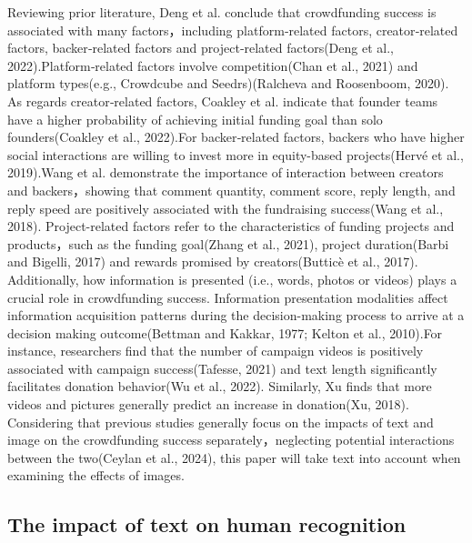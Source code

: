 \documentclass[a4paper]{article}
\begin{document}
Reviewing prior literature, Deng et al. conclude that crowdfunding success is associated with many factors，including platform‑related factors, creator‑related factors, backer‑related factors and project‑related factors(Deng et al., 2022).Platform‑related factors involve competition(Chan et al., 2021) and platform types(e.g., Crowdcube and Seedrs)(Ralcheva and Roosenboom, 2020). As regards creator‑related factors, Coakley et al. indicate that founder teams have a higher probability of achieving initial funding goal than solo founders(Coakley et al., 2022).For backer‑related factors, backers who have higher social interactions are willing to invest more in equity-based projects(Hervé et al., 2019).Wang et al. demonstrate the importance of interaction between creators and backers，showing that comment quantity, comment score, reply length, and reply speed are positively associated with the fundraising success(Wang et al., 2018). Project-related factors refer to the characteristics of funding projects and products，such as the funding goal(Zhang et al., 2021), project duration(Barbi and Bigelli, 2017) and rewards promised by creators(Butticè et al., 2017). Additionally, how information is presented (i.e., words, photos or videos) plays a crucial role in crowdfunding success. Information presentation modalities affect information acquisition patterns during the decision-making process to arrive at a decision making outcome(Bettman and Kakkar, 1977; Kelton et al., 2010).For instance, researchers find that the number of campaign videos is positively associated with campaign success(Tafesse, 2021) and text length significantly facilitates donation behavior(Wu et al., 2022). Similarly, Xu finds that more videos and pictures generally predict an increase in donation(Xu, 2018). Considering that previous studies generally focus on the impacts of text and image on the crowdfunding success separately，neglecting potential interactions between the two(Ceylan et al., 2024), this paper will take text into account when examining the effects of images.

\subsection{The impact of text on human recognition}
\end{document}
